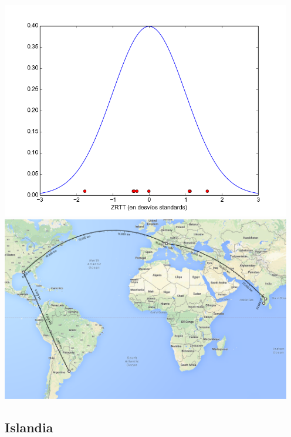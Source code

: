  \includegraphics[width=5in]{imgs/cusat_dist.png}
 \includegraphics[width=5in]{imgs/maps/cusat.png}

\subsection{Islandia}

